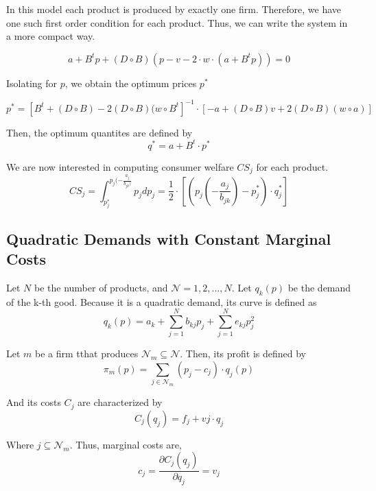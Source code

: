 \documentclass[12pt]{article}
\begin{document}
In this model each product is produced by exactly one firm. Therefore, we have one such first order condition for each product. Thus, we can write the system in a more compact way.

\begin{equation*}
a + B ^ t p + (D \circ B)(p - v - 2 \cdot w \cdot (a + B^t p)) = 0
\end{equation*}

Isolating for $p$, we obtain the optimum prices $p^*$

\begin{equation*}
p^* = [B^t + (D \circ B) - 2 (D \circ B)(w \circ B^t]^{-1} \cdot [-a + (D \circ B) v + 2 (D \circ B)(w \circ a)]
\end{equation*}

Then, the optimum quantites are defined by
\begin{equation*}
q^* = a + B^t \cdot p^*
\end{equation*}

We are now interested in computing consumer welfare $CS_j$ for each product. 
\begin{equation*}
CS_j = \int_{p_j^*}^{p_j(-\frac{a_j}{b_{jk})}} p_j d p_j = \frac{1}{2} \cdot [(p_j(-\frac{a_j}{b_{jk}}) - p_j^*) \cdot q_j^*]
\end{equation*}

\subsection{Quadratic Demands with Constant Marginal Costs}

Let $N$ be the number of products, and $\mathcal{N} = {1, 2, ..., N}.$
Let $q_k(p)$ be the demand of the k-th good. Because it is a quadratic demand, its curve is defined as 
\begin{equation*}
q_k(p) = a_k + \sum_{j=1}^N b_{kj}p_j + \sum_{j=1}^N e_{kj} p_j^2
\end{equation*}

Let $m$ be a firm tthat produces $\mathcal{N}_m \subseteq \mathcal{N}$. Then, its profit is defined by
\begin{equation*}
\pi_m(p) = \sum_{j \in \mathcal{N}_m} (p_j - c_j) \cdot q_j(p)
\end{equation*}

And its costs $C_j$ are characterized by 
\begin{equation*}
C_j(q_j) = f_j + vj \cdot q_j
\end{equation*}

Where $j \subseteq \mathcal{N}_m$. Thus, marginal costs are,
\begin{equation*}
c_j = \frac{\partial C_j(q_j)}{\partial q_j} = v_j
\end{equation*}
\end{document}
